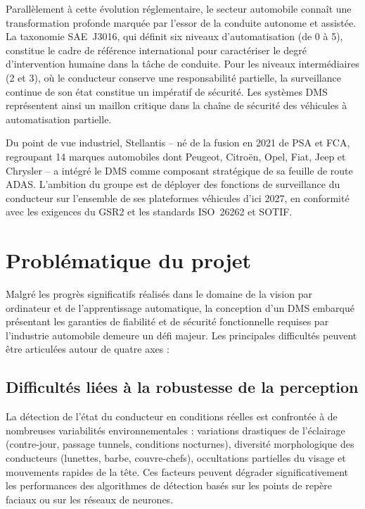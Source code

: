 \documentclass[12pt,a4paper]{report}
\begin{document}
Parall\`element \`a cette \'evolution r\'eglementaire, le secteur automobile conna\^it une transformation profonde marqu\'ee par l'essor de la conduite autonome et assist\'ee. La taxonomie SAE~J3016, qui d\'efinit six niveaux d'automatisation (de 0 \`a 5), constitue le cadre de r\'ef\'erence international pour caract\'eriser le degr\'e d'intervention humaine dans la t\^ache de conduite. Pour les niveaux interm\'ediaires (2 et 3), o\`u le conducteur conserve une responsabilit\'e partielle, la surveillance continue de son \'etat constitue un impératif de s\'ecurit\'e. Les syst\`emes DMS repr\'esentent ainsi un maillon critique dans la cha\^ine de s\'ecurit\'e des v\'ehicules \`a automatisation partielle.

Du point de vue industriel, Stellantis -- n\'e de la fusion en 2021 de PSA et FCA, regroupant 14 marques automobiles dont Peugeot, Citro\"en, Opel, Fiat, Jeep et Chrysler -- a int\'egr\'e le DMS comme composant strat\'egique de sa feuille de route ADAS. L'ambition du groupe est de d\'eployer des fonctions de surveillance du conducteur sur l'ensemble de ses plateformes v\'ehicules d'ici 2027, en conformit\'e avec les exigences du GSR2 et les standards ISO~26262 et SOTIF.

\section{Probl\'ematique du projet}

Malgr\'e les progr\`es significatifs r\'ealis\'es dans le domaine de la vision par ordinateur et de l'apprentissage automatique, la conception d'un DMS embarqu\'e pr\'esentant les garanties de fiabilit\'e et de s\'ecurit\'e fonctionnelle requises par l'industrie automobile demeure un d\'efi majeur. Les principales difficult\'es peuvent \^etre articul\'ees autour de quatre axes :

\subsection{Difficult\'es li\'ees \`a la robustesse de la perception}

La d\'etection de l'\'etat du conducteur en conditions r\'eelles est confront\'ee \`a de nombreuses variabilit\'es environnementales : variations drastiques de l'\'eclairage (contre-jour, passage tunnels, conditions nocturnes), diversit\'e morphologique des conducteurs (lunettes, barbe, couvre-chefs), occultations partielles du visage et mouvements rapides de la t\^ete. Ces facteurs peuvent d\'egrader significativement les performances des algorithmes de d\'etection bas\'es sur les points de rep\`ere faciaux ou sur les r\'eseaux de neurones.
\end{document}
